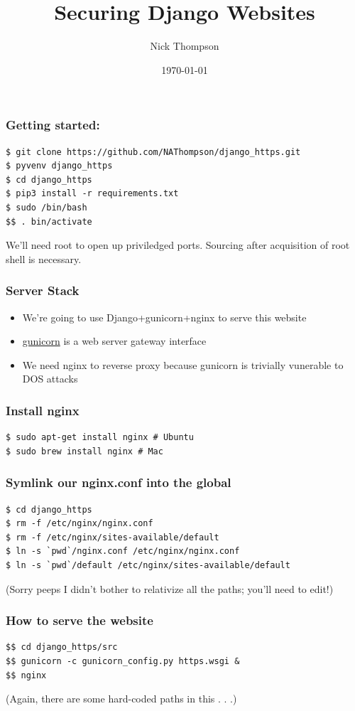 \documentclass[9pt]{beamer}
\begin{document}
\title{Securing Django Websites}
\author{Nick Thompson} 
\date{\today}

\frame{\titlepage}

\begin{frame}[fragile]
\frametitle{Getting started:}
\begin{verbatim}
$ git clone https://github.com/NAThompson/django_https.git
$ pyvenv django_https
$ cd django_https
$ pip3 install -r requirements.txt
$ sudo /bin/bash
$$ . bin/activate
\end{verbatim}
We'll need root to open up priviledged ports. Sourcing after acquisition of root shell is necessary.
\end{frame}

\begin{frame}
\frametitle{Server Stack}
\begin{itemize}
\item We're going to use Django+gunicorn+nginx to serve this website
\item \href{http://gunicorn.org/\#deployment}{gunicorn} is a web server gateway interface
\item We need nginx to reverse proxy because gunicorn is trivially vunerable to DOS attacks
\end{itemize}
\end{frame}

\begin{frame}[fragile]
\frametitle{Install nginx}
\begin{verbatim}
$ sudo apt-get install nginx # Ubuntu
$ sudo brew install nginx # Mac
\end{verbatim}
\end{frame}

\begin{frame}[fragile]
\frametitle{Symlink our nginx.conf into the global}
\begin{verbatim}
$ cd django_https
$ rm -f /etc/nginx/nginx.conf
$ rm -f /etc/nginx/sites-available/default
$ ln -s `pwd`/nginx.conf /etc/nginx/nginx.conf
$ ln -s `pwd`/default /etc/nginx/sites-available/default
\end{verbatim}
(Sorry peeps I didn't bother to relativize all the paths; you'll need to edit!)
\end{frame}

\begin{frame}[fragile]
\frametitle{How to serve the website}
\begin{verbatim}
$$ cd django_https/src
$$ gunicorn -c gunicorn_config.py https.wsgi &
$$ nginx
\end{verbatim}
(Again, there are some hard-coded paths in this . . .)
\end{frame}
\end{document}

